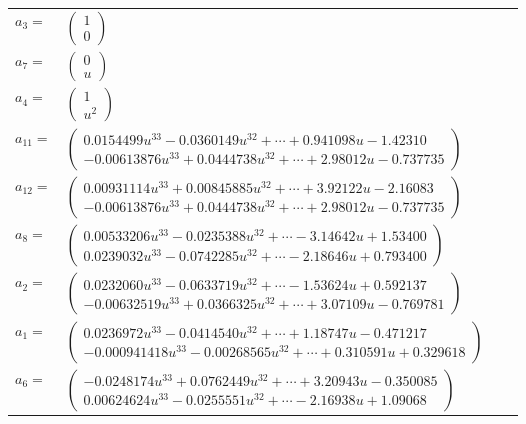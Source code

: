 \documentclass[1p]{elsarticle_modified}
\theoremstyle{definition}
\begin{document}
\begin{tabular}{m{7pt} m{180pt} m{7pt} m{180pt} }
\flushright $a_{3}=$&$\begin{pmatrix}1\\0\end{pmatrix}$ \\
\flushright $a_{7}=$&$\begin{pmatrix}0\\u\end{pmatrix}$ \\
\flushright $a_{4}=$&$\begin{pmatrix}1\\u^2\end{pmatrix}$ \\
\flushright $a_{11}=$&$\begin{pmatrix}0.0154499 u^{33}-0.0360149 u^{32}+\cdots+0.941098 u-1.42310\\-0.00613876 u^{33}+0.0444738 u^{32}+\cdots+2.98012 u-0.737735\end{pmatrix}$ \\
\flushright $a_{12}=$&$\begin{pmatrix}0.00931114 u^{33}+0.00845885 u^{32}+\cdots+3.92122 u-2.16083\\-0.00613876 u^{33}+0.0444738 u^{32}+\cdots+2.98012 u-0.737735\end{pmatrix}$ \\
\flushright $a_{8}=$&$\begin{pmatrix}0.00533206 u^{33}-0.0235388 u^{32}+\cdots-3.14642 u+1.53400\\0.0239032 u^{33}-0.0742285 u^{32}+\cdots-2.18646 u+0.793400\end{pmatrix}$ \\
\flushright $a_{2}=$&$\begin{pmatrix}0.0232060 u^{33}-0.0633719 u^{32}+\cdots-1.53624 u+0.592137\\-0.00632519 u^{33}+0.0366325 u^{32}+\cdots+3.07109 u-0.769781\end{pmatrix}$ \\
\flushright $a_{1}=$&$\begin{pmatrix}0.0236972 u^{33}-0.0414540 u^{32}+\cdots+1.18747 u-0.471217\\-0.000941418 u^{33}-0.00268565 u^{32}+\cdots+0.310591 u+0.329618\end{pmatrix}$ \\
\flushright $a_{6}=$&$\begin{pmatrix}-0.0248174 u^{33}+0.0762449 u^{32}+\cdots+3.20943 u-0.350085\\0.00624624 u^{33}-0.0255551 u^{32}+\cdots-2.16938 u+1.09068\end{pmatrix}$ \\

\end{tabular}
\end{document}
